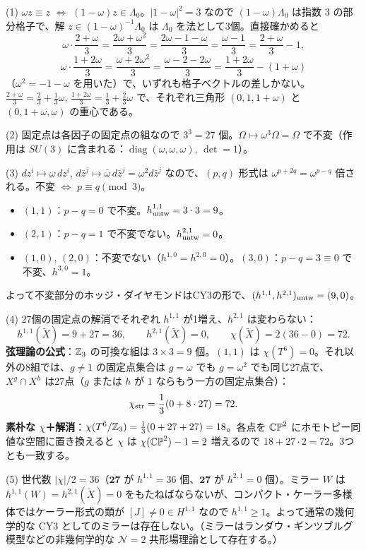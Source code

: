 \begin{solution}
(1) $\omega z\equiv z$ $\Leftrightarrow$ $(1-\omega)z\in\Lambda_0$。$\lvert1-\omega\rvert^2=3$ なので $(1-\omega)\Lambda_0$ は指数 $3$ の部分格子で、解 $z\in(1-\omega)^{-1}\Lambda_0$ は $\Lambda_0$ を法として3個。直接確かめると
\[
\omega\cdot\frac{2+\omega}{3}=\frac{2\omega+\omega^2}{3}=\frac{2\omega-1-\omega}{3}=\frac{\omega-1}{3}=\frac{2+\omega}{3}-1,
\]
\[
\omega\cdot\frac{1+2\omega}{3}=\frac{\omega+2\omega^2}{3}=\frac{\omega-2-2\omega}{3}=\frac{1+2\omega}{3}-(1+\omega)
\]
（$\omega^2=-1-\omega$ を用いた）で、いずれも格子ベクトルの差しかない。$\frac{2+\omega}{3}=\frac23+\frac13\omega$, $\frac{1+2\omega}{3}=\frac13+\frac23\omega$ で、それぞれ三角形 $(0,1,1+\omega)$ と $(0,1+\omega,\omega)$ の重心である。

(2) 固定点は各因子の固定点の組なので $3^3=27$ 個。$\Omega\mapsto\omega^3\Omega=\Omega$ で不変（作用は $SU(3)$ に含まれる：$\operatorname{diag}(\omega,\omega,\omega)$, $\det=1$）。

(3) $dz^i\mapsto\omega\,dz^i$, $d\bar z^j\mapsto\bar\omega\,d\bar z^j=\omega^2d\bar z^j$ なので、$(p,q)$ 形式は $\omega^{p+2q}=\omega^{p-q}$ 倍される。不変 $\Leftrightarrow$ $p\equiv q\pmod3$。
\begin{itemize}
\item $(1,1)$：$p-q=0$ で不変。$h^{1,1}_{\rm untw}=3\cdot3=9$。
\item $(2,1)$：$p-q=1$ で不変でない。$h^{2,1}_{\rm untw}=0$。
\item $(1,0)$, $(2,0)$：不変でない（$h^{1,0}=h^{2,0}=0$）。$(3,0)$：$p-q=3\equiv0$ で不変、$h^{3,0}=1$。
\end{itemize}
よって不変部分のホッジ・ダイヤモンドはCY3の形で、$(h^{1,1},h^{2,1})_{\rm untw}=(9,0)$。

(4) 27個の固定点の解消でそれぞれ $h^{1,1}$ が1増え、$h^{2,1}$ は変わらない：
\[
h^{1,1}(\widetilde X)=9+27=36,\qquad h^{2,1}(\widetilde X)=0,\qquad \chi(\widetilde X)=2(36-0)=72 .
\]
\textbf{弦理論の公式}：$\mathbb{Z}_3$ の可換な組は $3\times3=9$ 個。$(1,1)$ は $\chi(T^6)=0$。それ以外の8組では、$g\ne1$ の固定点集合は $g=\omega$ でも $g=\omega^2$ でも同じ27点で、$X^g\cap X^h$ は27点（$g$ または $h$ が $1$ ならもう一方の固定点集合）：
\[
\chi_{\rm str}=\frac13(0+8\cdot27)=72 .
\]
\textbf{素朴な $\chi$＋解消}：$\chi(T^6/\mathbb{Z}_3)=\frac13(0+27+27)=18$。各点を $\mathbb{CP}^2$ にホモトピー同値な空間に置き換えると $\chi$ は $\chi(\mathbb{CP}^2)-1=2$ 増えるので $18+27\cdot2=72$。3つとも一致する。

(5) 世代数 $\lvert\chi\rvert/2=36$（$\overline{\mathbf{27}}$ が $h^{1,1}=36$ 個、$\mathbf{27}$ が $h^{2,1}=0$ 個）。ミラー $W$ は $h^{1,1}(W)=h^{2,1}(\widetilde X)=0$ をもたねばならないが、コンパクト・ケーラー多様体ではケーラー形式の類が $[J]\ne0\in H^{1,1}$ なので $h^{1,1}\ge1$。よって通常の幾何学的な CY3 としてのミラーは存在しない。（ミラーはランダウ・ギンツブルグ模型などの非幾何学的な $\mathcal N=2$ 共形場理論として存在する。）
\end{solution}

